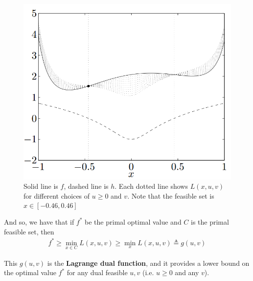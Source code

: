 \documentclass[11pt]{article}
\begin{document}
\begin{figure}[h]
  \centering
  \includegraphics[scale=0.3]{lagrangian.png}
  \caption{Solid line is $f$, dashed line is $h$. Each dotted line shows $L(x,u,v)$ for different choices of $u \geq 0$ and $v$. Note that the feasible set is $x \in [-0.46, 0.46]$}
  \label{fig:lagrangian}
\end{figure}

And so, we have that if $f^*$ be the primal optimal value and $C$ is the primal
feasible set, then
\begin{align*}
f^* \geq \min_{x \in C} L(x, u, v) \geq \min_x L(x, u, v) \triangleq g(u, v)
\end{align*}

This $g(u, v)$ is the \textbf{Lagrange dual function}, and it provides a lower
bound on the optimal value $f^*$ for any dual feasible $u, v$ (i.e. $u \geq 0$
and any $v$).
\end{document}
